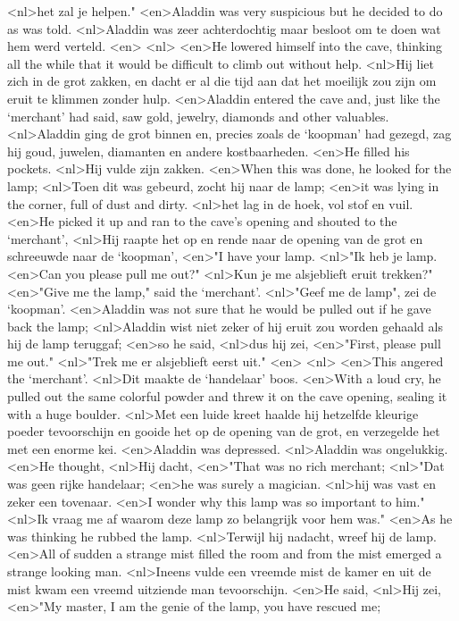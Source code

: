 <nl>het zal je helpen."
<en>Aladdin was very suspicious but he decided to do as was told.
<nl>Aladdin was zeer achterdochtig maar besloot om te doen wat hem werd verteld.
<en>
<nl>
<en>He lowered himself into the cave, thinking all the while that it would be difficult to climb out without help.
<nl>Hij liet zich in de grot zakken, en dacht er al die tijd aan dat het moeilijk zou zijn om  eruit te klimmen zonder hulp.
<en>Aladdin entered the cave and, just like the `merchant' had said, saw gold, jewelry, diamonds and other valuables.
<nl>Aladdin ging de grot binnen en, precies zoals de `koopman' had gezegd, zag hij goud, juwelen, diamanten en andere kostbaarheden.
<en>He filled his pockets.
<nl>Hij vulde zijn zakken.
<en>When this was done, he looked for the lamp;
<nl>Toen dit was gebeurd, zocht hij naar de lamp;
<en>it was lying in the corner, full of dust and dirty.
<nl>het lag in de hoek, vol stof en vuil.
<en>He picked it up and ran to the cave's opening and shouted to the `merchant',
<nl>Hij raapte het op en rende naar de opening van de grot en schreeuwde naar de `koopman',
<en>"I have your lamp.
<nl>"Ik heb je lamp.
<en>Can you please pull me out?"
<nl>Kun je me alsjeblieft eruit trekken?"
<en>"Give me the lamp," said the `merchant'.
<nl>"Geef me de lamp", zei de `koopman'.
<en>Aladdin was not sure that he would be pulled out if he gave back the lamp;
<nl>Aladdin wist niet zeker of hij eruit zou worden gehaald als hij de lamp teruggaf;
<en>so he said,
<nl>dus hij zei,
<en>"First, please pull me out."
<nl>"Trek me er alsjeblieft eerst uit."
<en>
<nl>
<en>This angered the `merchant'.
<nl>Dit maakte de `handelaar' boos.
<en>With a loud cry, he pulled out the same colorful powder and threw it on the cave opening, sealing it with a huge boulder.
<nl>Met een luide kreet haalde hij hetzelfde kleurige poeder tevoorschijn en gooide het op de opening van de grot, en verzegelde het met een enorme kei.
<en>Aladdin was depressed.
<nl>Aladdin was ongelukkig.
<en>He thought,
<nl>Hij dacht,
<en>"That was no rich merchant;
<nl>"Dat was geen rijke handelaar;
<en>he was surely a magician.
<nl>hij was vast en zeker een tovenaar.
<en>I wonder why this lamp was so important to him."
<nl>Ik vraag me af waarom deze lamp zo belangrijk voor hem was."
<en>As he was thinking he rubbed the lamp.
<nl>Terwijl hij nadacht, wreef hij de lamp.
<en>All of sudden a strange mist filled the room and from the mist emerged a strange looking man.
<nl>Ineens vulde een vreemde mist de kamer en uit de mist kwam een vreemd uitziende man tevoorschijn.
<en>He said,
<nl>Hij zei,
<en>"My master, I am the genie of the lamp, you have rescued me;
